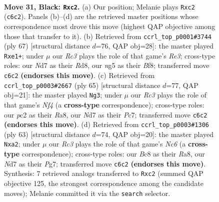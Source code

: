 \documentclass[11pt]{article}
\begin{document}
\clearpage

\begin{figure}[p]\centering
\begin{subfigure}{0.46\textwidth}\centering
\resizebox{\linewidth}{!}{%
\newchessgame
\chessboard[
  setfen={Q1b5/2pnkp1p/2r5/3p2N1/5P2/8/2P3P1/R4RK1 b - - 0 31},
  showmover=false,
  pgfstyle=straightmove, color=movearrow, markmove={c6-c2}
]}
\caption{}
\end{subfigure}\hfill
\begin{subfigure}{0.46\textwidth}\centering
\resizebox{\linewidth}{!}{%
\newchessgame
\chessboard[
  setfen={3r1bk1/6pp/4r3/6N1/P7/8/P5PP/1R2R2K b - - 4 34},
  showmover=false,
  pgfstyle=straightmove, color=movearrow, markmove={e6-e1}
]}
\caption{}
\end{subfigure}
\\[4pt]
\begin{subfigure}{0.46\textwidth}\centering
\resizebox{\linewidth}{!}{%
\newchessgame
\chessboard[
  setfen={r7/1pp5/3p2k1/p3nn2/2P2R2/8/PP4N1/5RK1 b - - 3 33},
  showmover=false,
  pgfstyle=straightmove, color=movearrow, markmove={f5-g3}
]}
\caption{}
\end{subfigure}\hfill
\begin{subfigure}{0.46\textwidth}\centering
\resizebox{\linewidth}{!}{%
\newchessgame
\chessboard[
  setfen={r5k1/5pp1/3Np2p/8/3P4/2n3PP/R1R2P2/6K1 b - - 0 32},
  showmover=false,
  pgfstyle=straightmove, color=movearrow, markmove={c3-a2}
]}
\caption{}
\end{subfigure}
\caption{\textbf{Move 31, Black: \texttt{Rxc2}.} (a) Our position; Melanie plays \texttt{Rxc2} (\texttt{c6c2}). Panels (b)--(d) are the retrieved master positions whose correspondence most drove this move (highest QAP objective among those that transfer to it). (b) Retrieved from \texttt{ccrl\_top\_p0001\#3744} (ply 67) [structural distance $d$=76, QAP obj=28]: the master played \texttt{Rxe1+}; under $\mu$ our \emph{Rc3} plays the role of that game's \emph{Re3}; cross-type roles: our \emph{N}d7 as their \emph{R}d8, our \emph{n}g5 as their \emph{B}f8; transferred move \texttt{c6c2} \textbf{(endorses this move)}. (c) Retrieved from \texttt{ccrl\_top\_p0003\#2667} (ply 65) [structural distance $d$=77, QAP obj=21]: the master played \texttt{Ng3}; under $\mu$ our \emph{Rc3} plays the role of that game's \emph{Nf4} (a \textbf{cross-type} correspondence); cross-type roles: our \emph{p}c2 as their \emph{R}a8, our \emph{N}d7 as their \emph{P}c7; transferred move \texttt{c6c2} \textbf{(endorses this move)}. (d) Retrieved from \texttt{ccrl\_top\_p0003\#1306} (ply 63) [structural distance $d$=74, QAP obj=20]: the master played \texttt{Nxa2}; under $\mu$ our \emph{Rc3} plays the role of that game's \emph{Nc6} (a \textbf{cross-type} correspondence); cross-type roles: our \emph{B}c8 as their \emph{R}a8, our \emph{N}d7 as their \emph{P}g7; transferred move \texttt{c6c2} \textbf{(endorses this move)}. Synthesis: 7 retrieved analogs transferred to \texttt{Rxc2} (summed QAP objective 125, the strongest correspondence among the candidate moves); Melanie committed it via the \texttt{search} selector.}
\label{fig:thought-m61}
\end{figure}
\end{document}
